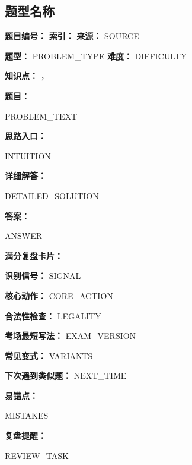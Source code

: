 \subsection{题型名称}

\begin{problemBox}
\begin{problemMeta}
\textbf{题目编号：}  \quad
\textbf{索引：}  \quad
\textbf{来源：} {{SOURCE}}

\textbf{题型：} {{PROBLEM_TYPE}} \quad
\textbf{难度：} {{DIFFICULTY}}

\textbf{知识点：} ，
\end{problemMeta}

\textbf{题目：}

{{PROBLEM_TEXT}}
\end{problemBox}

\begin{solutionBox}
\textbf{思路入口：}

{{INTUITION}}

\textbf{详细解答：}

{{DETAILED_SOLUTION}}

\textbf{答案：}

{{ANSWER}}
\end{solutionBox}

\begin{knowledgeBox}
\textbf{满分复盘卡片：}

\textbf{识别信号：} {{SIGNAL}}

\textbf{核心动作：} {{CORE_ACTION}}

\textbf{合法性检查：} {{LEGALITY}}

\textbf{考场最短写法：} {{EXAM_VERSION}}

\textbf{常见变式：} {{VARIANTS}}

\textbf{下次遇到类似题：} {{NEXT_TIME}}
\end{knowledgeBox}

\begin{mistakeBox}
\textbf{易错点：}

{{MISTAKES}}

\textbf{复盘提醒：}

{{REVIEW_TASK}}
\end{mistakeBox}

